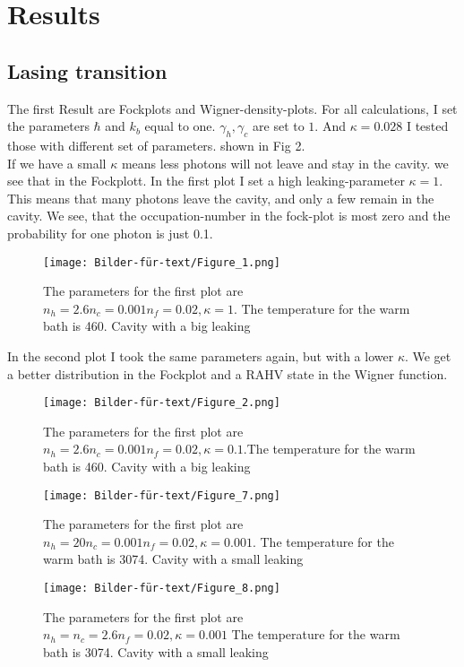 \documentclass[12pt,a4paper]{article}
\begin{document}
\section{Results}
\subsection{Lasing transition}
The first Result are Fockplots and Wigner-density-plots.
For all calculations, I set the parameters  $\hbar$ and $k_b$ equal to one. $\gamma_h, \gamma_c $ are set to $ 1$. And $\kappa=0.028$
I tested those with different set of parameters. 
shown in Fig 2.\\

If we have a small $\kappa$ means less photons will not leave and stay in the cavity. we see that in the Fockplott.
In the first plot I set a high leaking-parameter $\kappa=1$.
This means that many photons leave the cavity, and only a few remain in the cavity. 
We see, that the occupation-number in the fock-plot is most zero and the probability for one photon is just 0.1.

\begin{figure}[hbtp]
\centering
\texttt{[image: Bilder-für-text/Figure\_1.png]}
\caption{The parameters for the first plot are$ n_h=2.6 n_c=0.001 n_f=0.02,\kappa=1$. The temperature for the warm bath is 460. Cavity with a big leaking}
\end{figure}\newpage

In the second plot I took the same parameters again, but with a lower $\kappa$. We get a better distribution in the Fockplot and a RAHV state in the Wigner function. 

\begin{figure}[hbtp]
\centering
\texttt{[image: Bilder-für-text/Figure\_2.png]}
\caption{The parameters for the first plot are $n_h=2.6 n_c=0.001 n_f=0.02,\kappa=0.1$.The temperature for the warm bath is 460. Cavity with a big leaking}
\end{figure}

\begin{figure}[hbtp]
\centering
\texttt{[image: Bilder-für-text/Figure\_7.png]}
\caption{The parameters for the first plot are$ n_h=20 n_c=0.001 n_f=0.02,\kappa=0.001$. The temperature for the warm bath is 3074. Cavity with a small leaking}
\end{figure}


\begin{figure}[hbtp]
\centering
\texttt{[image: Bilder-für-text/Figure\_8.png]}
\caption{The parameters for the first plot are $ n_h=n_c=2.6 n_f=0.02,\kappa=0.001$ The temperature for the warm bath is 3074. Cavity with a small leaking}
\end{figure}
\end{document}
